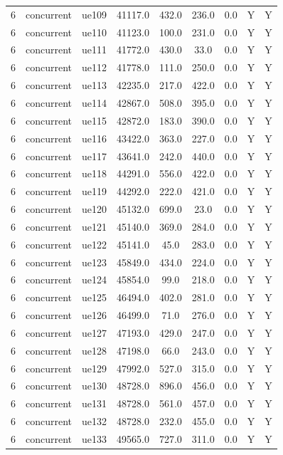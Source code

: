 \begin{table}[ht]
\begin{tabular}{|c|c|c|c|c|c|c|c|c|}
6 & concurrent & ue109 & 41117.0 & 432.0 & 236.0 & 0.0 & Y & Y \\
6 & concurrent & ue110 & 41123.0 & 100.0 & 231.0 & 0.0 & Y & Y \\
6 & concurrent & ue111 & 41772.0 & 430.0 & 33.0 & 0.0 & Y & Y \\
6 & concurrent & ue112 & 41778.0 & 111.0 & 250.0 & 0.0 & Y & Y \\
6 & concurrent & ue113 & 42235.0 & 217.0 & 422.0 & 0.0 & Y & Y \\
6 & concurrent & ue114 & 42867.0 & 508.0 & 395.0 & 0.0 & Y & Y \\
6 & concurrent & ue115 & 42872.0 & 183.0 & 390.0 & 0.0 & Y & Y \\
6 & concurrent & ue116 & 43422.0 & 363.0 & 227.0 & 0.0 & Y & Y \\
6 & concurrent & ue117 & 43641.0 & 242.0 & 440.0 & 0.0 & Y & Y \\
6 & concurrent & ue118 & 44291.0 & 556.0 & 422.0 & 0.0 & Y & Y \\
6 & concurrent & ue119 & 44292.0 & 222.0 & 421.0 & 0.0 & Y & Y \\
6 & concurrent & ue120 & 45132.0 & 699.0 & 23.0 & 0.0 & Y & Y \\
6 & concurrent & ue121 & 45140.0 & 369.0 & 284.0 & 0.0 & Y & Y \\
6 & concurrent & ue122 & 45141.0 & 45.0 & 283.0 & 0.0 & Y & Y \\
6 & concurrent & ue123 & 45849.0 & 434.0 & 224.0 & 0.0 & Y & Y \\
6 & concurrent & ue124 & 45854.0 & 99.0 & 218.0 & 0.0 & Y & Y \\
6 & concurrent & ue125 & 46494.0 & 402.0 & 281.0 & 0.0 & Y & Y \\
6 & concurrent & ue126 & 46499.0 & 71.0 & 276.0 & 0.0 & Y & Y \\
6 & concurrent & ue127 & 47193.0 & 429.0 & 247.0 & 0.0 & Y & Y \\
6 & concurrent & ue128 & 47198.0 & 66.0 & 243.0 & 0.0 & Y & Y \\
6 & concurrent & ue129 & 47992.0 & 527.0 & 315.0 & 0.0 & Y & Y \\
6 & concurrent & ue130 & 48728.0 & 896.0 & 456.0 & 0.0 & Y & Y \\
6 & concurrent & ue131 & 48728.0 & 561.0 & 457.0 & 0.0 & Y & Y \\
6 & concurrent & ue132 & 48728.0 & 232.0 & 455.0 & 0.0 & Y & Y \\
6 & concurrent & ue133 & 49565.0 & 727.0 & 311.0 & 0.0 & Y & Y \\

\end{tabular}
\end{table}
